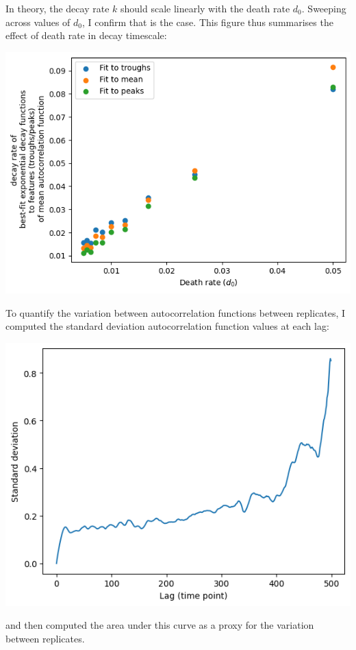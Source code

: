 \begin{enumerate}
\begin{enumerate}
\begin{enumerate}
In theory, the decay rate \(k\) should scale linearly with the death rate \(d_{0}\).  Sweeping across values of \(d_{0}\), I confirm that is the case.  This figure thus summarises the effect of death rate in decay timescale:
\begin{center}
\includegraphics[width=.9\linewidth]{deathrate_vs_decay.png}
\end{center}

To quantify the variation between autocorrelation functions between replicates, I computed the standard deviation autocorrelation function values at each lag:
\begin{center}
\includegraphics[width=.9\linewidth]{stddevauc_example.png}
\end{center}

and then computed the area under this curve as a proxy for the variation between replicates.


\end{enumerate}
\end{enumerate}
\end{enumerate}
